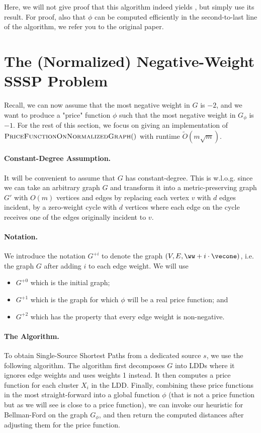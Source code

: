 Here, we will not give proof that this algorithm indeed yields , but simply use its result. For proof, also that $\phi$ can be computed efficiently in the second-to-last line of the algorithm, we refer you to the original paper.

\section{The (Normalized) Negative-Weight SSSP Problem}

Recall, we can now assume that the most negative weight in $G$ is $-2$, and we want to produce a "price" function $\phi$ such that the most negative weight in $G_{\phi}$ is $-1$. For the rest of this section, we focus on giving an implementation of $\textsc{PriceFunctionOnNormalizedGraph}()$ with runtime $\tilde{O}(m\sqrt{m})$.

\paragraph{Constant-Degree Assumption.} It will be convenient to assume that $G$ has constant-degree. This is w.l.o.g. since we can take an arbitrary graph $G$ and transform it into a metric-preserving graph $G'$ with $O(m)$ vertices and edges by replacing each vertex $v$ with $d$ edges incident, by a zero-weight cycle with $d$ vertices where each edge on the cycle receives one of the edges originally incident to $v$.

\paragraph{Notation.} We introduce the notation $G^{+i}$ to denote the graph $(V, E, \ww + i \cdot \vecone)$, i.e. the graph $G$ after adding $i$ to each edge weight. We will use 
\begin{itemize}
    \item $G^{+0}$ which is the initial graph;
    \item $G^{+1}$ which is the graph for which $\phi$ will be a real price function; and
    \item $G^{+2}$ which has the property that every edge weight is non-negative.
\end{itemize}  

\paragraph{The Algorithm.} To obtain Single-Source Shortest Paths from a dedicated source $s$, we use the following algorithm. The algorithm first decomposes $G$ into LDDs where it ignores edge weights and uses weights 1 instead. It then computes a price function for each cluster $X_i$ in the LDD. Finally, combining these price functions in the most straight-forward into a global function $\phi$ (that is not a price function but as we will see is close to a price function), we can invoke our heuristic for Bellman-Ford on the graph $G_{\phi}$, and then return the computed distances after adjusting them for the price function.

